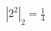 \documentclass[preview]{standalone}
\begin{document}
\begin{align*}
\left| 2^{2} \right|_2 = \frac{1}{4}
\end{align*}
\end{document}
